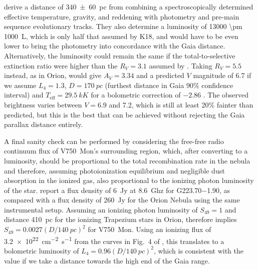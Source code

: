 \documentclass[useAMS, usenatbib, a4paper]{mnras}
\begin{document}
\citet{Fairlamb:2015a} derive a distance of \SI{340 \pm 60}{pc} from
combining a spectroscopically determined effective temperature,
gravity, and reddening with photometry and pre-main sequence
evolutionary tracks.  They also determine a luminosity of \SI{13000
  \pm 1000}{L_\odot}, which is only half that assumed by K18, and
would have to be even lower to bring the photometry into concordance
with the Gaia distance.  Alternatively, the luminosity could remain
the same if the total-to-selective extinction ratio were higher than
the \(R_V = 3.1\) assumed by \citet{Fairlamb:2015a}.  Taking
\(R_V = 5.5\) instead, as in Orion, would give \(A_V = 3.34\) and a
predicted \(V\) magnitude of 6.7 if we assume \(L_4 = 1.3\),
\(D = \SI{170}{pc}\) (furthest distance in Gaia 90\% confidence
interval) and \(T_{\text{eff}} = \SI{29.5}{kK}\)
\citep{Fairlamb:2015a} for a bolometric correction of \(-2.86\)
\citep{Nieva:2013a}.  The observed brightness varies between
\(V = 6.9\) and 7.2, which is still at least 20\% fainter than
predicted, but this is the best that can be achieved without rejecting
the Gaia parallax distance entirely.

A final sanity check can be performed by considering the free-free
radio continuum flux of V750~Mon's surrounding \hii{} region, which,
after converting to a luminosity, should be proportional to the total
recombination rate in the nebula and therefore, assuming
photoionization equilibrium and negligible dust absorption in the
ionized gas, also proportional to the ionizing photon luminosity of
the star.  \citet{Quireza:2006b} report a flux density of \SI{6}{Jy}
at \SI{8.6}{Ghz} for G\num{223.70}\num{-1.90}, as compared with a flux
density of \SI{260}{Jy} for the Orion Nebula using the same
instrumental setup.  Assuming an ionizing photon luminosity of
\(S_{49} = 1\) and distance \SI{410}{pc} for the ionizing Trapezium
stars in Orion, therefore implies
\(S_{49} = 0.0027 (D/\SI{140}{pc})^2\) for V750~Mon.  Using an
ionizing flux of \SI{3.2e22}{cm^{-2}.s^{-1}} from the curves in Fig.~4
of \citet{Sternberg:2003a}, this translates to a bolometric luminosity
of \(L_4 = 0.96 (D/\SI{140}{pc})^2\), which is consistent with the
\citet{Fairlamb:2015a} value if we take a distance towards the high
end of the Gaia range.

\end{document}
